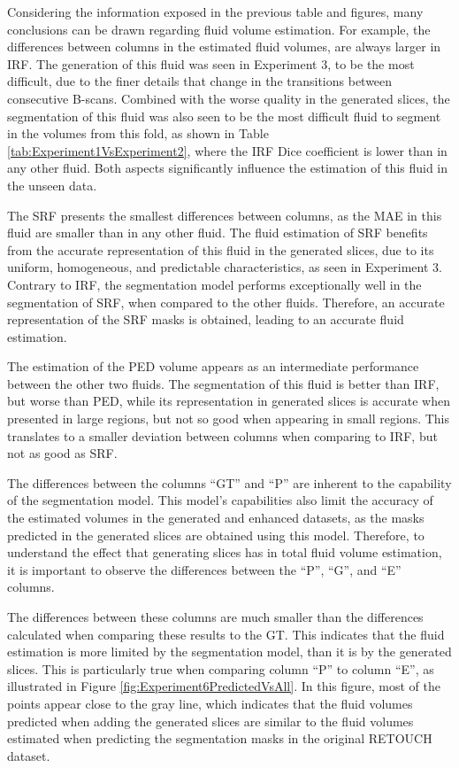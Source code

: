 Considering the information exposed in the previous table and figures, many conclusions can be drawn regarding fluid volume estimation. For example, the differences between columns in the estimated fluid volumes, are always larger in IRF. The generation of this fluid was seen in Experiment 3, to be the most difficult, due to the finer details that change in the transitions between consecutive B-scans. Combined with the worse quality in the generated slices, the segmentation of this fluid was also seen to be the most difficult fluid to segment in the volumes from this fold, as shown in Table \ref{tab:Experiment1VsExperiment2}, where the IRF Dice coefficient is lower than in any other fluid. Both aspects significantly influence the estimation of this fluid in the unseen data. 
\par
The SRF presents the smallest differences between columns, as the MAE in this fluid are smaller than in any other fluid. The fluid estimation of SRF benefits from the accurate representation of this fluid in the generated slices, due to its uniform, homogeneous, and predictable characteristics, as seen in Experiment 3. Contrary to IRF, the segmentation model performs exceptionally well in the segmentation of SRF, when compared to the other fluids. Therefore, an accurate representation of the SRF masks is obtained, leading to an accurate fluid estimation.
\par
The estimation of the PED volume appears as an intermediate performance between the other two fluids. The segmentation of this fluid is better than IRF, but worse than PED, while its representation in generated slices is accurate when presented in large regions, but not so good when appearing in small regions. This translates to a smaller deviation between columns when comparing to IRF, but not as good as SRF.
\par
The differences between the columns ``GT'' and ``P'' are inherent to the capability of the segmentation model. This model's capabilities also limit the accuracy of the estimated volumes in the generated and enhanced datasets, as the masks predicted in the generated slices are obtained using this model. Therefore, to understand the effect that generating slices has in total fluid volume estimation, it is important to observe the differences between the ``P'', ``G'', and ``E'' columns. 
\par
The differences between these columns are much smaller than the differences calculated when comparing these results to the GT. This indicates that the fluid estimation is more limited by the segmentation model, than it is by the generated slices. This is particularly true when comparing column ``P'' to column ``E'', as illustrated in Figure \ref{fig:Experiment6PredictedVsAll}. In this figure, most of the points appear close to the gray line, which indicates that the fluid volumes predicted when adding the generated slices are similar to the fluid volumes estimated when predicting the segmentation masks in the original RETOUCH dataset.
